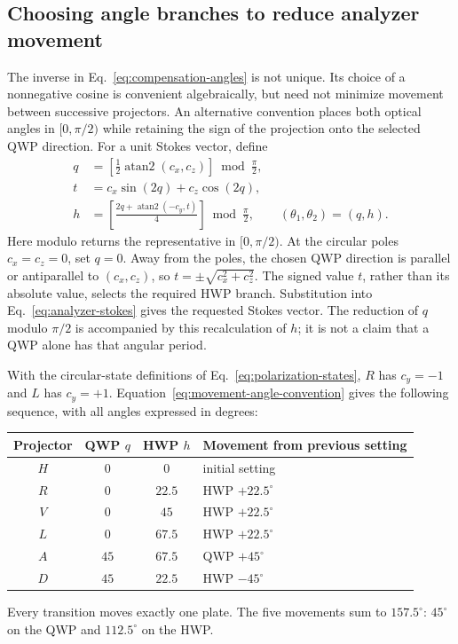 \documentclass[a4paper,10pt]{article}
\begin{document}
\subsection{Choosing angle branches to reduce analyzer movement}

The inverse in Eq.~\eqref{eq:compensation-angles} is not unique. Its
choice of a nonnegative cosine is convenient algebraically, but need not
minimize movement between successive projectors. An alternative convention
places both optical angles in $[0,\pi/2)$ while retaining the sign of the
projection onto the selected QWP direction. For a unit Stokes vector,
define
\begin{equation}
    \boxed{
    \begin{aligned}
        q&=\left[\frac12\operatorname{atan2}(c_x,c_z)\right]
            \bmod\frac{\pi}{2},\\
        t&=c_x\sin(2q)+c_z\cos(2q),\\
        h&=\left[\frac{2q+\operatorname{atan2}(-c_y,t)}{4}\right]
            \bmod\frac{\pi}{2},
        \qquad (\theta_1,\theta_2)=(q,h).
    \end{aligned}}
    \label{eq:movement-angle-convention}
\end{equation}
Here modulo returns the representative in $[0,\pi/2)$. At the circular
poles $c_x=c_z=0$, set $q=0$. Away from the poles, the chosen QWP direction
is parallel or antiparallel to $(c_x,c_z)$, so
$t=\pm\sqrt{c_x^2+c_z^2}$. The signed value $t$, rather than its absolute
value, selects the required HWP branch. Substitution into
Eq.~\eqref{eq:analyzer-stokes} gives the requested Stokes vector.
The reduction of $q$ modulo $\pi/2$ is accompanied by this recalculation
of $h$; it is not a claim that a QWP alone has that angular period.

With the circular-state definitions of Eq.~\eqref{eq:polarization-states},
$R$ has $c_y=-1$ and $L$ has $c_y=+1$. Equation~\eqref{eq:movement-angle-convention}
gives the following sequence, with all angles expressed in degrees:
\begin{center}
\begin{tabular}{c c c l}
Projector & QWP $q$ & HWP $h$ & Movement from previous setting\\
\hline
$H$ & $0$ & $0$ & initial setting\\
$R$ & $0$ & $22.5$ & HWP $+22.5^\circ$\\
$V$ & $0$ & $45$ & HWP $+22.5^\circ$\\
$L$ & $0$ & $67.5$ & HWP $+22.5^\circ$\\
$A$ & $45$ & $67.5$ & QWP $+45^\circ$\\
$D$ & $45$ & $22.5$ & HWP $-45^\circ$
\end{tabular}
\end{center}
Every transition moves exactly one plate. The five movements sum to
$157.5^\circ$: $45^\circ$ on the QWP and $112.5^\circ$ on the HWP.
\end{document}
